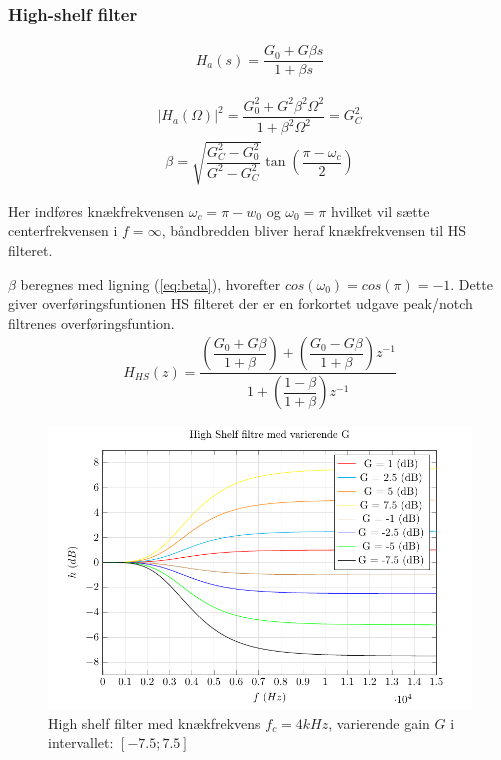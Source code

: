    
     \subsubsection{High-shelf filter}

     \begin{align}
        H_a (s) = \dfrac{G_0 + G \beta s}{1 + \beta s}
     \end{align}

     \begin{align}
         |H_a(\Omega)|^2 = \dfrac{G_0^2 + G^2 \beta^2 \Omega^2}{1 + \beta^2 \Omega^2} = G_C^2
     \end{align}
    \begin{align}
        \beta = \sqrt{\dfrac{G_C^2 - G_0^2}{G^2 - G_C^2}} \tan \left( \dfrac{\pi - \omega_c}{2} \right)
    \end{align}


     Her indføres knækfrekvensen $\omega_c = \pi - w_0$ og $\omega_0 = \pi$ hvilket vil sætte centerfrekvensen i $f = \infty$, båndbredden bliver heraf knækfrekvensen 
     til HS filteret.

     $\beta$ beregnes med ligning (\ref{eq:beta}), hvorefter $cos(\omega_0) = cos(\pi) = -1$. Dette giver overføringsfuntionen HS filteret 
     der er en forkortet udgave peak/notch filtrenes overføringsfuntion.
     \begin{align}
     H_{HS}(z) =     \dfrac{\left(\dfrac{G_0 + G \beta}{1 + \beta} \right) + \left(\dfrac{ G_0 - G \beta}{1 + \beta }\right) z^{-1}}{1  + \left( \dfrac{1 - \beta}{1 + \beta} \right) z^{-1}}
     \end{align}


  \begin{figure}[h]
      \centering
        \includegraphics[]{figure/iir_hs.pdf}
        \caption{High shelf filter med knækfrekvens $f_c = 4kHz$, varierende gain $G$ i intervallet: $[-7.5 ; 7.5]$}
   \end{figure}  



